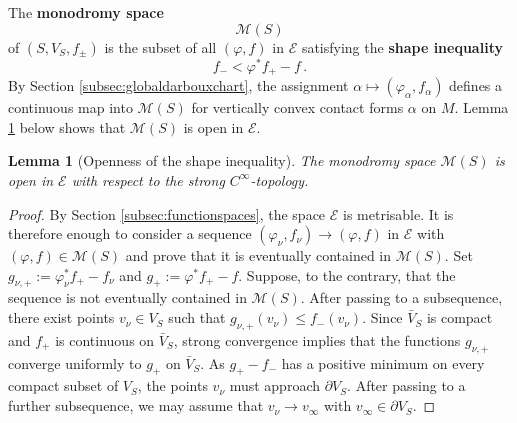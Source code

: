 \documentclass{amsart}
\newtheorem{lem}[prop]{Lemma}
\theoremstyle{definition}
\newcommand{\EE}{\mathcal E}
\newcommand{\MM}{\mathcal M}
\newcommand{\ra}{\rightarrow}
\begin{document}
The {\bf monodromy space}
\[
  \MM(S)
\]
of $(S,V_S,f_{\pm})$
is the subset of all $(\varphi,f)$ in $\EE$
satisfying the {\bf shape inequality}
\[
  f_-<\varphi^*f_+-f
  \,.
\]
By Section \ref{subsec:globaldarbouxchart},
the assignment
$\alpha\mapsto(\varphi_\alpha,f_\alpha)$
defines a continuous map into $\MM(S)$
for vertically convex contact forms $\alpha$ on $M$.
Lemma \ref{lem:openshapeinequality} below
shows that $\MM(S)$ is open in $\EE$.


\begin{lem}[Openness of the shape inequality]
\label{lem:openshapeinequality}
The monodromy space $\MM(S)$ is open in $\EE$
with respect to the strong $C^{\infty}$-topology.
\end{lem}


\begin{proof}
By Section \ref{subsec:functionspaces},
the space $\EE$ is metrisable.
It is therefore enough to consider a sequence
$(\varphi_{\nu},f_{\nu})\ra(\varphi,f)$ in $\EE$
with $(\varphi,f)\in\MM(S)$
and prove that it is eventually contained in $\MM(S)$.
Set $g_{\nu,+}:=\varphi_{\nu}^*f_+-f_{\nu}$ and
$g_+:=\varphi^*f_+-f$.
Suppose, to the contrary,
that the sequence is not eventually contained in $\MM(S)$.
After passing to a subsequence,
there exist points $v_{\nu}\in V_S$ such that
$g_{\nu,+}(v_{\nu})\leq f_-(v_{\nu})$.
Since $\bar{V}_S$ is compact
and $f_+$ is continuous on $\bar{V}_S$,
strong convergence implies that
the functions $g_{\nu,+}$ converge uniformly to $g_+$
on $\bar{V}_S$.
As $g_+-f_-$ has a positive minimum
on every compact subset of $V_S$,
the points $v_{\nu}$ must approach $\partial V_S$.
After passing to a further subsequence,
we may assume that
$v_{\nu}\ra v_{\infty}$ with $v_{\infty}\in\partial V_S$.


\end{proof}
\end{document}
